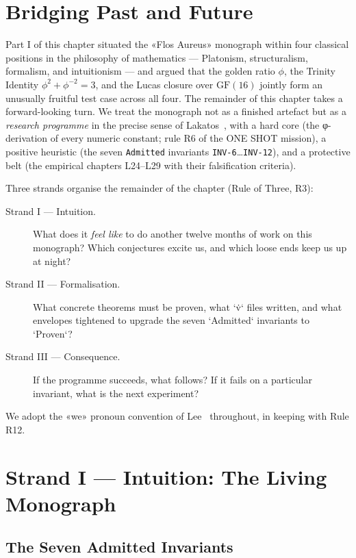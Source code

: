\section{Bridging Past and Future}
\label{sec:31-bridge}

Part I of this chapter situated the «Flos Aureus» monograph within four classical positions in the philosophy of mathematics — Platonism, structuralism, formalism, and intuitionism — and argued that the golden ratio $\phi$, the Trinity Identity $\phi^{2} + \phi^{-2} = 3$, and the Lucas closure over $\mathrm{GF}(16)$ jointly form an unusually fruitful test case across all four. The remainder of this chapter takes a forward-looking turn. We treat the monograph not as a finished artefact but as a \emph{research programme} in the precise sense of Lakatos~\cite{cox_golden_ratio}, with a hard core (the φ-derivation of every numeric constant; rule R6 of the ONE SHOT mission), a positive heuristic (the seven \texttt{Admitted} invariants \texttt{INV-6}…\texttt{INV-12}), and a protective belt (the empirical chapters L24–L29 with their falsification criteria).

Three strands organise the remainder of the chapter (Rule of Three, R3):
\begin{description}
    \item[Strand I — Intuition.] What does it \emph{feel like} to do another twelve months of work on this monograph? Which conjectures excite us, and which loose ends keep us up at night?
    \item[Strand II — Formalisation.] What concrete theorems must be proven, what `\.v` files written, and what envelopes tightened to upgrade the seven `Admitted` invariants to `Proven`?
    \item[Strand III — Consequence.] If the programme succeeds, what follows? If it fails on a particular invariant, what is the next experiment?
\end{description}
We adopt the «we» pronoun convention of Lee~\cite{livio_fibonacci_numbers} throughout, in keeping with Rule R12.

\section{Strand I — Intuition: The Living Monograph}
\label{sec:31-strand-1}

\subsection{The Seven Admitted Invariants}
\label{sec:31-seven-admitted}


